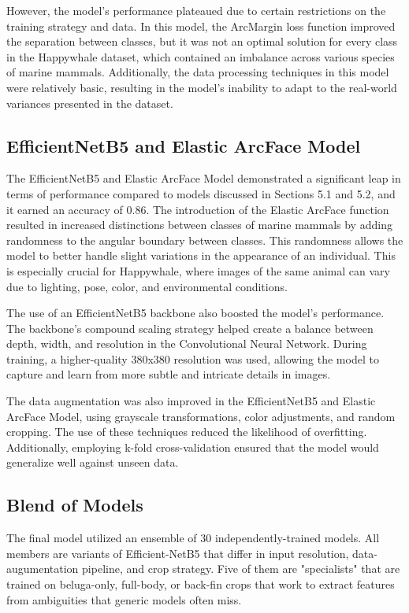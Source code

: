 \documentclass[twocolumn]{article}
\begin{document}
However, the model's performance plateaued due to certain restrictions on the training strategy and data. In this model, the ArcMargin loss function improved the separation between classes, but it was not an optimal solution for every class in the Happywhale dataset, which contained an imbalance across various species of marine mammals. Additionally, the data processing techniques in this model were relatively basic, resulting in the model's inability to adapt to the real-world variances presented in the dataset.

\subsection{EfficientNetB5 and Elastic ArcFace Model}

The EfficientNetB5 and Elastic ArcFace Model demonstrated a significant leap in terms of performance compared to models discussed in Sections 5.1 and 5.2, and it earned an accuracy of 0.86. The introduction of the Elastic ArcFace function resulted in increased distinctions between classes of marine mammals by adding randomness to the angular boundary between classes. This randomness allows the model to better handle slight variations in the appearance of an individual. This is especially crucial for Happywhale, where images of the same animal can vary due to lighting, pose, color, and environmental conditions. 

The use of an EfficientNetB5 backbone also boosted the model's performance. The backbone's compound scaling strategy helped create a balance between depth, width, and resolution in the Convolutional Neural Network. During training, a higher-quality 380x380 resolution was used, allowing the model to capture and learn from more subtle and intricate details in images.

The data augmentation was also improved in the EfficientNetB5 and Elastic ArcFace Model, using grayscale transformations, color adjustments, and random cropping. The use of these techniques reduced the likelihood of overfitting. Additionally, employing k-fold cross-validation ensured that the model would generalize well against unseen data. 

\subsection{Blend of Models}

The final model utilized an ensemble of 30 independently-trained models. All members are variants of Efficient-NetB5 that differ in input resolution, data-augumentation pipeline, and crop strategy. Five of them are "specialists" that are trained on beluga-only, full-body, or back-fin crops that work to extract features from ambiguities that generic models often miss.
\end{document}
